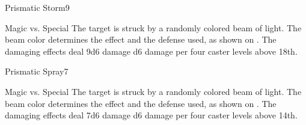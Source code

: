 \begin{spellsection}{Prismatic Storm}{9}
\begin{spellheader}
\end{spellheader}
\begin{spellcontent}
    \begin{spelltargetinginfo}
    \end{spelltargetinginfo}
    \begin{spelleffects}
        \begin{spellattack}{Magic vs. Special}
            \spellspecial The target is struck by a randomly colored beam of light. The beam color determines the effect and the defense used, as shown on . The damaging effects deal 9d6 damage \add d6 damage per four caster levels above 18th.
        \end{spellattack}
    \end{spelleffects}
\end{spellcontent}
\begin{spellfooter}
\end{spellfooter}
\end{spellsection}

\begin{spellsection}{Prismatic Spray}{7}
\begin{spellheader}
\end{spellheader}
\begin{spellcontent}
    \begin{spelltargetinginfo}
    \end{spelltargetinginfo}
    \begin{spelleffects}
        \begin{spellattack}{Magic vs. Special}
            \spellspecial The target is struck by a randomly colored beam of light. The beam color determines the effect and the defense used, as shown on . The damaging effects deal 7d6 damage \add d6 damage per four caster levels above 14th.
        \end{spellattack}
    \end{spelleffects}
\end{spellcontent}
\begin{spellfooter}
\end{spellfooter}
\end{spellsection}

